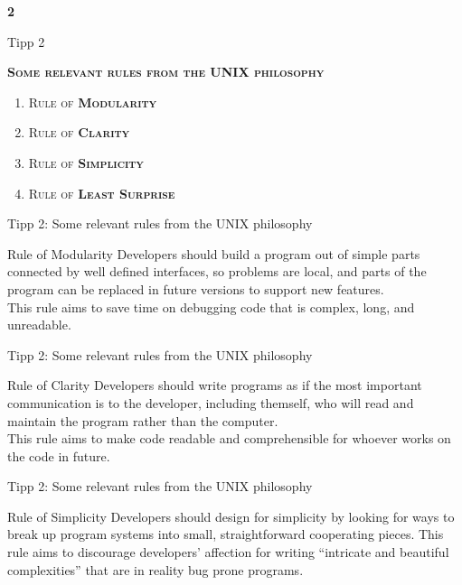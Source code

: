 \documentclass[18pt]{beamer}
\newcommand{\quotes}[1]{``#1''}
\begin{document}
\begin{frame}{\quad}
    \center
    \Huge{\textbf{2}}
\end{frame}

\begin{frame}{Tipp 2}
    \begin{block}{}
        \center
        \textsc{\textbf{Some relevant rules from the UNIX philosophy}}
        \vspace{.2in}
        \begin{enumerate}
            \item \textsc{Rule of \textbf{Modularity}}
            \item \textsc{Rule of \textbf{Clarity}}
            \item \textsc{Rule of \textbf{Simplicity}}
            \item \textsc{Rule of \textbf{Least Surprise}}
        \end{enumerate}
    \end{block}
\end{frame}

\begin{frame}{Tipp 2: Some relevant rules from the UNIX philosophy}
    \begin{exampleblock}{Rule of Modularity}
        Developers should build a program out of simple parts connected by well defined interfaces, so problems are local,
        and parts of the program can be replaced in future versions to support new features.\\
        This rule aims to save time on debugging code that is complex, long, and unreadable.
    \end{exampleblock}
\end{frame}

\begin{frame}{Tipp 2: Some relevant rules from the UNIX philosophy}
    \begin{exampleblock}{Rule of Clarity}
        Developers should write programs as if the most important communication is to the developer, including themself,
        who will read and maintain the program rather than the computer.\\
        This rule aims to make code readable and comprehensible for whoever works on the code in future.
    \end{exampleblock}
\end{frame}

\begin{frame}{Tipp 2: Some relevant rules from the UNIX philosophy}
    \begin{exampleblock}{Rule of Simplicity}
        Developers should design for simplicity by looking for ways to break up program systems into small,
        straightforward cooperating pieces. This rule aims to discourage developers'
        affection for writing \quotes{intricate and beautiful complexities} that are in reality bug prone programs.
    \end{exampleblock}
\end{frame}
\end{document}
